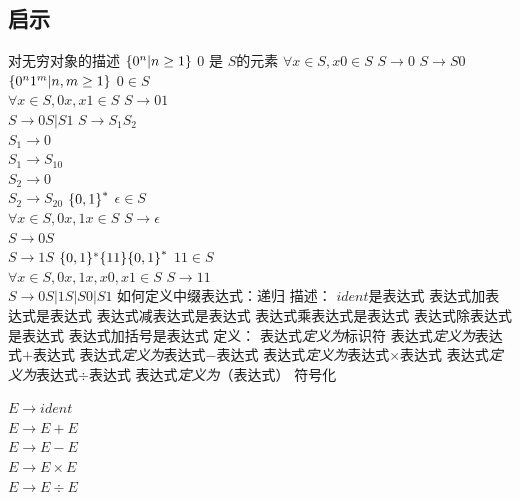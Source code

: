 \documentclass{ctexart}
\DeclarePairedDelimiter{\set}{\{}{\}}
\begin{document}
\subsection{启示}
\begin{outline}
    \1 对无穷对象的描述
        \2 $\set*{0^n | n \geq 1}$
            \3 $0$ 是 $S$的元素
            \3 $\forall x \in S, x0 \in S$
            \3 $S \to 0$
            \3 $S \to S0$
        \2 $\set*{0^n1^m | n, m \geq 1}$
            \3 $0 \in S$ \\
               $\forall x \in S, 0x, x1 \in S$
            \3 $S \to 01$ \\
               $S \to 0S | S1$
            \3 $S \to S_1S_2$ \\
               $S_1 \to 0$ \\
               $S_1 \to S_10$ \\
               $S_2 \to 0$ \\
               $S_2 \to S_20$
        \2 $\set*{0,1}^*$
            \3 $\epsilon \in S$ \\
               $\forall x \in S, 0x, 1x \in S$
            \3 $S \to \epsilon$ \\
               $S \to 0S $\\
               $S \to 1S $
        \2 $\set*{0,1\}^*\set*{11}\{0,1}^*$
            \3 $11 \in S$ \\
               $\forall x \in S, 0x, 1x, x0, x1 \in S$
            \3 $S \to 11$ \\
               $S \to 0S | 1S | S0 | S1$
    \1 如何定义中缀表达式：递归
        \2 描述：
            \3 $ident$是表达式
            \3 表达式加表达式是表达式
            \3 表达式减表达式是表达式
            \3 表达式乘表达式是表达式
            \3 表达式除表达式是表达式
            \3 表达式加括号是表达式
        \2 定义：
            \3 表达式\emph{定义为}标识符
            \3 表达式\emph{定义为}表达式$+$表达式
            \3 表达式\emph{定义为}表达式$-$表达式
            \3 表达式\emph{定义为}表达式$\times$表达式
            \3 表达式\emph{定义为}表达式$\div$表达式
            \3 表达式\emph{定义为}（表达式）
        \2 符号化 \par
               $E \to ident$ \\
               $E \to E + E$ \\
               $E \to E - E$ \\
               $E \to E \times E$ \\
               $E \to E \div E$ \\

\end{outline}
\end{document}
